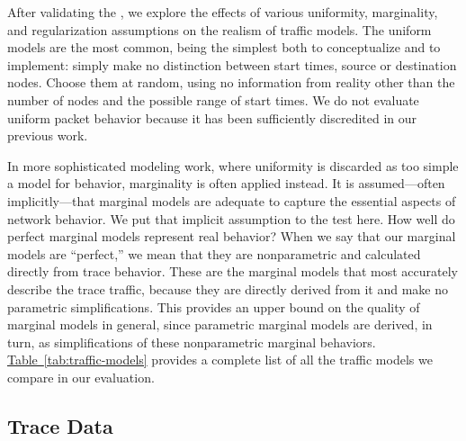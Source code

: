 \documentclass[twocolumn,final]{svjour3}
\newcommand{\caps}[1]{{\smaller{#1}}}
\newcommand{\Table}[1]{\hyperref[tab:#1]{Table~\ref*{tab:#1}}}
\begin{document}
After validating the \caps{GMM}, we explore the effects of various uniformity, marginality, and regularization assumptions on the realism of traffic models. The uniform models are the most common, being the simplest both to conceptualize and to implement: simply make no distinction between start times, source or destination nodes. Choose them at random, using no information from reality other than the number of nodes and the possible range of start times. We do not evaluate uniform packet behavior because it has been sufficiently discredited in our previous work.

In more sophisticated modeling work, where uniformity is discarded as too simple a model for behavior, marginality is often applied instead. It is assumed---often implicitly---that marginal models are adequate to capture the essential aspects of network behavior. We put that implicit assumption to the test here. How well do perfect marginal models represent real behavior? When we say that our marginal models are ``perfect,'' we mean that they are nonparametric and calculated directly from trace behavior. These are the marginal models that most accurately describe the trace traffic, because they are directly derived from it and make no parametric simplifications. This provides an upper bound on the quality of marginal models in general, since parametric marginal models are derived, in turn, as simplifications of these nonparametric marginal behaviors. \Table{traffic-models} provides a complete list of all the traffic models we compare in our evaluation.


\subsection{Trace Data}\label{sec:trace-data}
\end{document}
